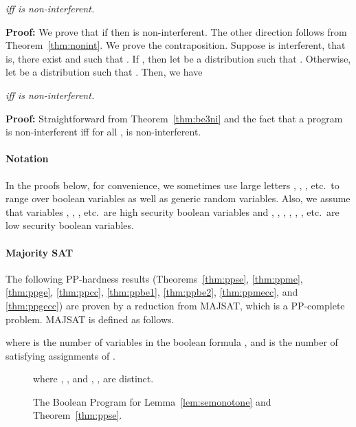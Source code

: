 \documentclass{llncs}
\newenvironment{proof}{\noindent\rm{\bf Proof:}}{\hbox{}\vspace*{0.2\baselineskip}}
\newenvironment{reftheorem}[1]{\begin{trivlist}\item[\hskip
      \labelsep{\bf Theorem #1.}]\it}{\end{trivlist}}
\begin{document}
\begin{reftheorem}{\ref{thm:be3ni}}
 iff  is non-interferent.
\end{reftheorem}
\begin{proof}
  We prove that if 
  then  is non-interferent.  The other direction follows from
  Theorem~\ref{thm:nonint}.  We prove the contraposition.  Suppose
   is interferent, that is, there exist  and  such
  that . If ,
  then let  be a distribution such that
  .  Otherwise, let
   be a distribution such that .  Then, we have

\end{proof}

\begin{reftheorem}{\ref{thm:be4ni}}
 iff  is non-interferent.
\end{reftheorem}
\begin{proof}
Straightforward from Theorem~\ref{thm:be3ni} and the fact that a program  is
non-interferent iff for all ,  is non-interferent.
\end{proof}

\paragraph*{\bf Notation}
In the proofs below, for convenience, we sometimes use large letters
, , , etc.~to range over boolean variables as well as generic
random variables.  Also, we assume that variables , , ,
etc.~are high security boolean variables and , , , ,
, , etc.~are low security boolean variables.

\paragraph*{\bf Majority SAT}
The following PP-hardness results (Theorems~\ref{thm:ppse},
\ref{thm:ppme}, \ref{thm:ppge}, \ref{thm:ppcc}, \ref{thm:ppbe1},
\ref{thm:ppbe2}, \ref{thm:ppmecc}, and \ref{thm:ppgecc}) are proven by
a reduction from MAJSAT, which is a PP-complete problem.  MAJSAT is
defined as follows.

where  is the number of variables in the boolean formula , and
 is the number of satisfying assignments of .

\begin{figure}[t]

where , , and , ,  are distinct.
\caption{The Boolean Program for Lemma~\ref{lem:semonotone} and Theorem~\ref{thm:ppse}.}
\label{fig:boolenc}
\end{figure}
\end{document}
